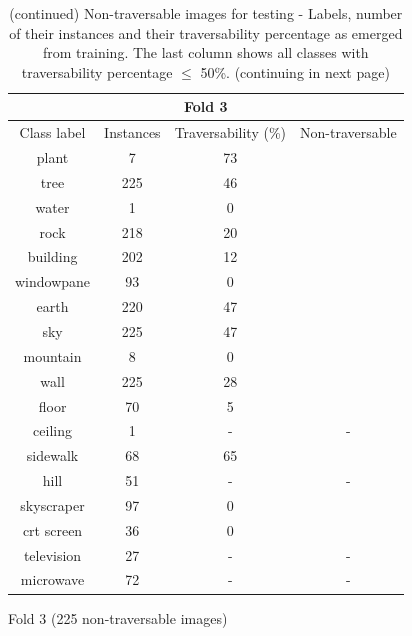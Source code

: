 \documentclass[12pt,a4paper,table,dvipsnames,tikz]{report}
\begin{document}
	\begin{table}[h!]
		\ContinuedFloat %
		\begin{subtable}[h!]{\textwidth}
			\centering
			\begin{tabular}{|c|c|c|c|}
				\hline
				\multicolumn{4}{|c|}{Fold 3}\\
				\hline
				Class label & Instances & Traversability (\%) & Non-traversable\\
				\hline\hline
				plant & 7 & 73 &\\
				\hline
				\rowcolor{tree}
				tree & 225 & 46 & \checkmark\\
				\hline
				water & 1 & 0 & \checkmark\\
				\hline
				rock & 218 & 20 & \checkmark\\
				\hline
				building & 202 & 12 & \checkmark\\
				\hline
				windowpane & 93 & 0 & \checkmark\\
				\hline
				\rowcolor{earth}
				earth & 220 & 47 & \checkmark\\
				\hline
				\rowcolor{sky}
				sky & 225 & 47 & \checkmark\\
				\hline
				mountain & 8 & 0 & \checkmark\\
				\hline
				wall & 225 & 28 & \checkmark\\
				\hline
				floor & 70 & 5 & \checkmark\\
				\hline
				ceiling & 1 & - & -\\
				\hline
				sidewalk & 68 & 65 &\\
				\hline
				hill & 51 & - & -\\
				\hline
				skyscraper & 97 & 0 & \checkmark\\
				\hline
				crt screen & 36 & 0 & \checkmark\\
				\hline
				television & 27 & - & -\\
				\hline
				microwave & 72 & - & -\\
				\hline
			\end{tabular}
			\caption{Fold 3 (225 non-traversable images)}
			\label{table:obst.f3}
		\end{subtable}
		\caption{(continued) Non-traversable images for testing - Labels, number of their instances 
			and their traversability percentage as emerged from training. The last column shows all 
			classes with traversability percentage $\le$ 50\%. (continuing in next page)}
	\end{table}
	
\end{document}
